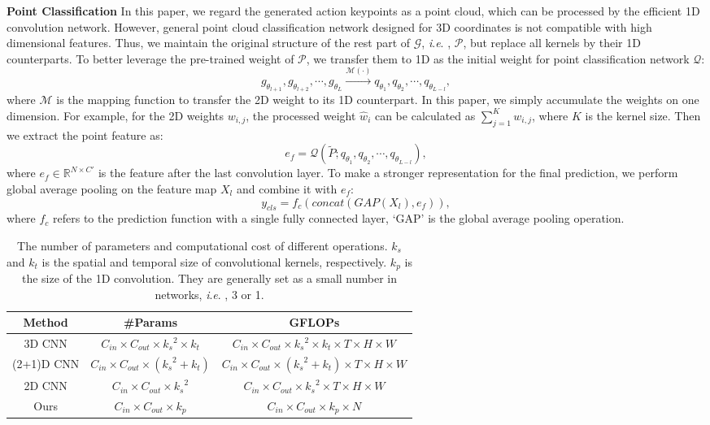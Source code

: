 \documentclass[journal]{IEEEtran}
\newcommand{\ie}{\textit{i}.\textit{e}. }
\begin{document}
\textbf{Point Classification}
In this paper, we regard the generated action keypoints as a point cloud, which can be processed by the efficient 1D convolution network.
However, general point cloud classification network designed for 3D coordinates is not compatible with high dimensional features.
Thus, we maintain the original structure of the rest part of $\mathcal{G}$, \ie, $\mathcal{P}$, but replace all kernels by their 1D counterparts.
To better leverage the pre-trained weight of $\mathcal{P}$, we transfer them to 1D as the initial weight for point classification network $\mathcal{Q}$:
\begin{equation}
	g_{\theta_{l+1}}, g_{\theta_{l+2}}, \cdots, g_{\theta_{L}} \overset{\mathcal{M}(\cdot)}{\rightarrow}q_{\theta_{1}}, q_{\theta_{2}},\cdots, q_{\theta_{L-l}},
\end{equation}
where $\mathcal{M}$ is the mapping function to transfer the 2D weight to its 1D counterpart.
In this paper, we simply accumulate the weights on one dimension.
For example, for the 2D weights $w_{i,j}$, the processed weight $\hat{w}_{i}$ can be calculated as $\sum_{j=1}^{K}w_{i,j}$, where $K$ is the kernel size.
Then we extract the point feature as:
\begin{equation}
	e_f = \mathcal{Q}(\tilde{P};q_{\theta_{1}}, q_{\theta_{2}},\cdots, q_{\theta_{L-l}}),
\end{equation}
where $e_f\in \mathbb{R}^{N\times C'}$ is the feature after the last convolution layer.
To make a stronger representation for the final prediction, we perform global average pooling on the feature map $X_l$ and combine it with $e_f$:
\begin{equation}
	y_{cls} = f_c(concat(GAP(X_l),e_f)),
\end{equation}
where $f_c$ refers to the prediction function with a single fully connected layer, `GAP' is the global average pooling operation.

\begin{table*}[ht]
	\centering
	\caption{The number of parameters and computational cost of different operations. $k_s$ and $k_t$ is the spatial and temporal size of convolutional kernels, respectively. $k_p$ is the size of the 1D convolution. They are generally set as a small number in networks, \ie, 3 or 1.}
	\label{tab:comp_show}
	\begin{tabular}{ccc}
		\hline
		\textbf{Method}  & \textbf{\#Param}s & \textbf{GFLOPs} \\ \hline
		3D CNN  &  $C_{in}\times C_{out}\times{k_s}^2\times k_t$   &  $C_{in}\times C_{out}\times{k_s}^2\times k_t\times T\times H\times W$   \\
		(2+1)D CNN &   $C_{in}\times C_{out}\times({k_s}^2+ k_t)$  &  ${C_{in}\times C_{out}}\times({k_s}^2+k_t)\times T\times H\times W$   \\
		2D CNN      &   ${C_{in}\times C_{out}}\times{k_s}^2$  &  ${C_{in}\times C_{out}}\times{k_s}^2\times T\times H\times W$   \\ \hline
		Ours    &   $C_{in}\times C_{out}\times k_p$  &   $C_{in}\times C_{out}\times k_p\times N $ \\ \hline
	\end{tabular}
\end{table*}
\end{document}
